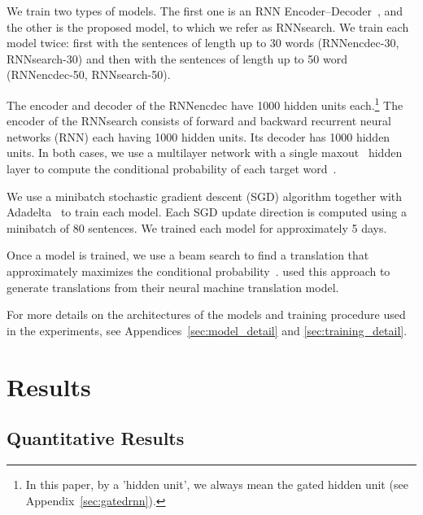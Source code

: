 \documentclass{article}
\begin{document}
We train two types of models. The first one is an RNN
Encoder--Decoder~\citep[RNNencdec,][]{Cho2014}, and the other is the proposed
model, to which we refer as RNNsearch. We train each model twice: first with the
sentences of length up to 30 words (RNNencdec-30, RNNsearch-30) and then with the
sentences of length up to 50 word (RNNencdec-50, RNNsearch-50).

The encoder and decoder of the RNNencdec have 1000 hidden units each.\footnote{
    In this paper, by a 'hidden unit', we always mean the gated hidden unit (see
    Appendix~\ref{sec:gatedrnn}).
} The encoder of the RNNsearch consists of forward and backward recurrent neural
networks (RNN) each having 1000 hidden units. Its decoder has 1000 hidden units.
In both cases, we use a multilayer network with a single
maxout~\citep{Goodfellow2013} hidden layer to compute the conditional
probability of each target word~\citep{Pascanu2014rec}.

We use a minibatch stochastic gradient descent (SGD) algorithm together with
Adadelta~\citep{Zeiler2012} to train each model. Each SGD update direction is
computed using a minibatch of 80 sentences. We trained each model for
approximately 5 days.

Once a model is trained, we use a beam search to find a translation that
approximately maximizes the conditional probability~\citep[see,
e.g.,][]{Graves2012,Boulanger2013}. \citet{Sutskever2014} used this approach to
generate translations from their neural machine translation model.

For more details on the architectures of the models and training procedure used
in the experiments, see Appendices~\ref{sec:model_detail} and
\ref{sec:training_detail}.

\section{Results}
\label{sec:exp_results}

\subsection{Quantitative Results}
\end{document}
